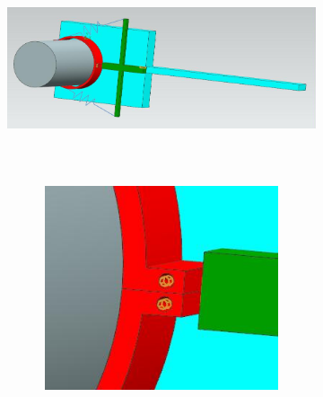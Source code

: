 \documentclass[12pt]{article}
\begin{document}
{	\begin{figure}[H]
		\begin{subfigure}{0.49\textwidth}
			\centering\includegraphics[height=6cm,width=1\textwidth,keepaspectratio]{var8_0.jpeg}
			\caption{}
			\label{fig:var8_0.jpeg}
		\end{subfigure}
		\begin{subfigure}{0.49\textwidth}
			\centering\includegraphics[height=6cm,width=1\textwidth,keepaspectratio]{var8_1.jpeg}
			\caption{}
			\label{fig:var8_1.jpeg}
		\end{subfigure}


\end{figure}}
\end{document}
